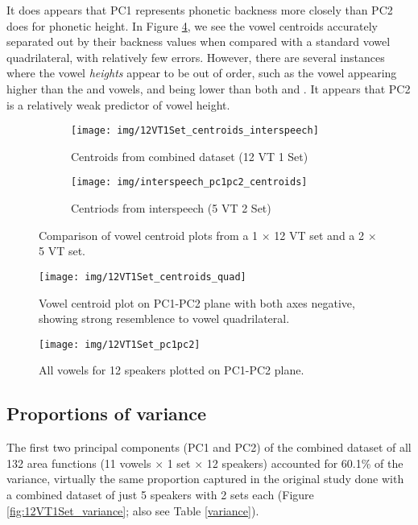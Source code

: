 It does appears that PC1 represents phonetic backness more closely than PC2 does for phonetic height. In Figure \ref{fig:12VT1Set_centroids_quad}, we see the vowel centroids accurately separated out by their backness values when compared with a standard vowel quadrilateral, with relatively few errors. However, there are several instances where the vowel \textit{heights} appear to be out of order, such as the  vowel appearing higher than the  and  vowels, and  being lower than both  and . It appears that PC2 is a relatively weak predictor of vowel height.

\begin{figure}[H]
\begin{subfigure}{.5\textwidth}
  \centering
  \texttt{[image: img/12VT1Set\_centroids\_interspeech]}
  \caption{Centroids from combined dataset (12 VT 1 Set)}
  \label{fig:12VT1Set_centroids_interspeech}
\end{subfigure}%
\begin{subfigure}{.5\textwidth}
  \centering
  \texttt{[image: img/interspeech\_pc1pc2\_centroids]}
  \caption{Centriods from interspeech (5 VT 2 Set)}
  \label{fig:interspeech_pc1pc2_centroids}
\end{subfigure}
\caption{Comparison of vowel centroid plots from a 1 $\times$ 12 VT set and a 2 $\times$ 5 VT set.}
\label{fig:centroids}
\end{figure}

\begin{figure}[H]
  \centering
  \texttt{[image: img/12VT1Set\_centroids\_quad]}
  \caption{Vowel centroid plot on PC1-PC2 plane with both axes negative, showing strong resemblence to vowel quadrilateral.}
      \label{fig:12VT1Set_centroids_quad}
\end{figure}

\begin{figure}[H]
  \centering
  \texttt{[image: img/12VT1Set\_pc1pc2]}
  \caption{All vowels for 12 speakers plotted on PC1-PC2 plane.}
  \label{fig:12VT1Set_pc1pc2}
\end{figure}

\subsection{Proportions of variance}

The first two principal components (PC1 and PC2) of the combined dataset of all 132 area functions (11 vowels $\times$ 1 set $\times$ 12 speakers) accounted for 60.1\% of the variance, virtually the same proportion captured in the original study \cite{watson2014mappings} done with a combined dataset of just 5 speakers with 2 sets each (Figure \ref{fig:12VT1Set_variance}; also see Table \ref{variance}).

